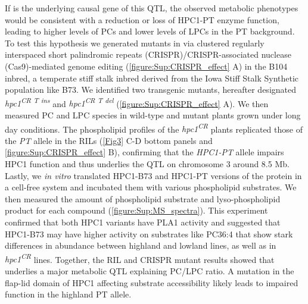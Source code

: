 If \hpc is the underlying causal gene of this QTL, the observed metabolic phenotypes would be consistent with a reduction or loss of HPC1-PT enzyme function, leading to higher levels of PCs and lower levels of LPCs in the PT background. 
To test this hypothesis we generated mutants in \hpc via clustered regularly interspaced short palindromic repeats (CRISPR)/CRISPR-associated nuclease (Cas9)-mediated genome editing (\autoref{figure:Sup:CRISPR_effect} A) in the B104 inbred, a temperate stiff stalk inbred derived from the Iowa Stiff Stalk Synthetic population like B73. 
We identified two transgenic mutants, hereafter designated \textit{hpc1\textsuperscript{CR T ins}} and \textit{hpc1\textsuperscript{CR T del}} (\autoref{figure:Sup:CRISPR_effect} A).
We then measured PC and LPC species in wild-type and mutant plants grown under long day conditions.  
The phospholipid profiles of the \textit{hpc1\textsuperscript{CR}} plants 
replicated those of the \textit{PT} allele in the RILs (\autoref{Fig3} C-D bottom panels and \autoref{figure:Sup:CRISPR_effect} B), confirming that the \textit{HPC1-PT} allele impairs HPC1 function and thus underlies the QTL on chromosome 3 around 8.5 Mb. 
Lastly, we \textit{in vitro} translated HPC1-B73 and HPC1-PT  versions of the protein in a cell-free system and incubated them with various phospholipid substrates. 
We then measured the amount of phospholipid substrate and lyso-phospholipid product for each compound (\autoref{figure:Sup:MS_spectra}). 
This experiment confirmed that both HPC1 variants have PLA1 activity and suggested that HPC1-B73 may have higher activity on substrates like PC36:4 that show stark differences in abundance between highland and lowland lines, as well as in \textit{hpc1\textsuperscript{CR}} lines.
Together, the RIL and CRISPR mutant results showed that \hpc underlies a major metabolic QTL explaining PC/LPC ratio. 
A mutation in the flap-lid domain of HPC1 affecting substrate accessibility likely leads to impaired function in the highland PT allele.

